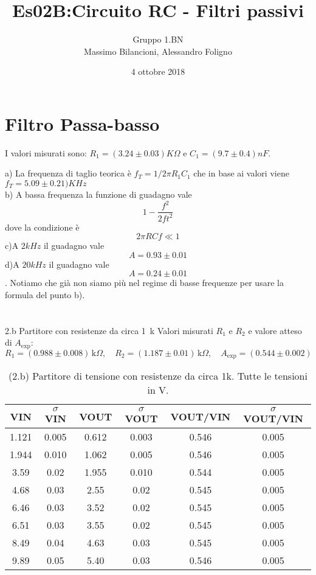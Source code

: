 \documentclass[10pt,a4paper]{article}
\author{Gruppo 1.BN \\ Massimo Bilancioni, Alessandro Foligno }
\title{Es02B:Circuito RC - Filtri passivi}
\begin{document}
\date{4 ottobre 2018}
\maketitle

\setcounter{section}{1}
\section{Filtro Passa-basso}
I valori misurati sono: $R_1  = (3.24\pm 0.03 )K\Omega$ e  $C_1  = (9.7\pm 0.4 )nF$.

a) La frequenza di taglio teorica è  $f_T = 1/2\pi R_1 C_1$ che in base ai valori viene $f_T = 5.09\pm 0.21)KHz$\\
b) A bassa frequenza la funzione di guadagno vale \[1-\frac{f^2}{2ft^2}\] dove la condizione è \[2\pi RCf\ll1\]
c)A $2kHz$ il guadagno vale \[A=0.93\pm0.01\]
d)A $20kHz$ il guadagno vale \[A=0.24\pm0.01\]. Notiamo che già non siamo più nel regime di basse frequenze per usare la formula del punto b).
\section{}{2.b Partitore con resistenze da circa 1~k}
Valori misurati $R_1$ e $R_2$ e valore atteso di $A_\mathrm{exp}$:
\[
R_1 = (0.988  \pm0.008  ) \,\mathrm{k}\Omega, \quad
R_2 = (1.187 \pm 0.01 ) \,\mathrm{k}\Omega, \quad
A_\mathrm{exp} = ( 0.544 \pm 0.002 ) 
\]


\begin{table}[h]
\centering
\begin{tabular}{|c|c|c|c|c|c|}
\hline 
VIN& $\sigma$ VIN  &VOUT	 & $\sigma$ VOUT& VOUT/VIN & $\sigma$ VOUT/VIN \\
\hline 
1.121 & 0.005 & 0.612 & 0.003 & 0.546 & 0.005\\
1.944& 0.010 & 1.062& 0.005 & 0.546 & 0.005\\

3.59& 0.02 & 1.955 & 0.010 & 0.544 & 0.005\\

4.68 & 0.03 & 2.55 & 0.02 & 0.545 & 0.005\\
6.46 & 0.03 & 3.52 & 0.02 & 0.545& 0.005\\
6.51 & 0.03& 3.55 & 0.02& 0.545 & 0.005 \\
8.49 & 0.04 & 4.63& 0.03 & 0.545& 0.005\\
9.89 & 0.05 & 5.40 & 0.03 & 0.546 & 0.005\\


\hline 
\end{tabular} 
\caption{(2.b) Partitore di tensione con resistenze da circa 1k. Tutte le tensioni in V.\label{t:par1}}
\end{table}
\end{document}
